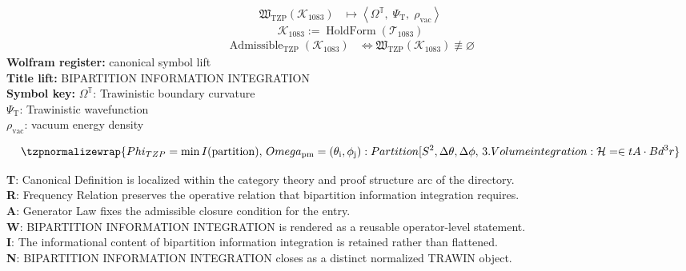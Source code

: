 \noindent
\begin{minipage}[t]{0.48\linewidth}
\begingroup
\small
\[
\begin{aligned}
\mathfrak{W}_{\mathrm{TZP}}\!\left(\mathcal{K}_{1083}\right)
&\longmapsto
\left\langle \Omega^{\mathbb{T}},\; \Psi_{\mathrm{T}},\; \rho_{\mathrm{vac}} \right\rangle
\end{aligned}
\]
\[
\mathcal{K}_{1083}
:=
\operatorname{HoldForm}\!\left(\mathcal{T}_{1083}\right)
\]
\[
\begin{aligned}
\operatorname{Admissible}_{\mathrm{TZP}}\!\left(\mathcal{K}_{1083}\right)
&\Longleftrightarrow
\mathfrak{W}_{\mathrm{TZP}}\!\left(\mathcal{K}_{1083}\right)\not\equiv\varnothing
\end{aligned}
\]
\textbf{Wolfram register:} canonical symbol lift\\
\textbf{Title lift:} BIPARTITION INFORMATION INTEGRATION\\
\textbf{Symbol key:} \(\Omega^{\mathbb{T}}\): Trawinistic boundary curvature\\ \(\Psi_{\mathrm{T}}\): Trawinistic wavefunction\\ \(\rho_{\mathrm{vac}}\): vacuum energy density
\par
\endgroup
\end{minipage}\hfill
\begin{minipage}[t]{0.48\linewidth}
\[
\tzpnormalizewrap{Phi_{TZP} = \min I(\text{partition}),\,Omega_\mathrm{pm} = {(\theta_{\mathrm{i}}, \phi_{\mathrm{j}}) : Partition[S^{2}, {\Delta\theta, \Delta\phi}},\,3. Volume integration: \mathcal{H} = \in t A\cdot B d^{3}r}
\]

\small
\textbf{T}: Canonical Definition is localized within the category theory and proof structure arc of the directory.\\
\textbf{R}: Frequency Relation preserves the operative relation that bipartition information integration requires.\\
\textbf{A}: Generator Law fixes the admissible closure condition for the entry.\\
\textbf{W}: BIPARTITION INFORMATION INTEGRATION is rendered as a reusable operator-level statement.\\
\textbf{I}: The informational content of bipartition information integration is retained rather than flattened.\\
\textbf{N}: BIPARTITION INFORMATION INTEGRATION closes as a distinct normalized TRAWIN object.
\normalsize
\end{minipage}

